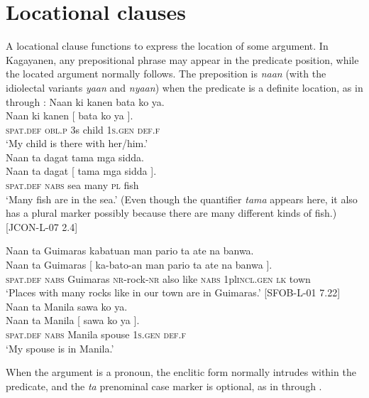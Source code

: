 \section{Locational clauses}
\label{bkm:Ref229903412}\label{sec:locationalclauses}

A locational clause functions to express the location of some argument. In Kagayanen, any prepositional phrase may appear in the predicate position, while the located argument normally follows. The preposition is \textit{naan} (with the idiolectal variants \textit{yaan} and \textit{nyaan}) when the predicate is a definite location, as in  through : 
\ea
\label{bkm:Ref107331810}
Naan  ki  kanen  bata  ko  ya. \\\smallskip
\gll Naan  ki  kanen  [ bata  ko  ya{ }]. \\
\textsc{spat.def}  \textsc{obl.p} 3s {} child  1\textsc{s.gen}  \textsc{def.f} \\
\glt ‘My child is there with her/him.’ \\
\z
\ea
Naan  ta  dagat  tama  mga  sidda. \\\smallskip
\gll Naan  ta  dagat [ tama  mga  sidda{ }]. \\
\textsc{spat.def}  \textsc{nabs}  sea {} many  \textsc{pl}  fish \\
\glt ‘Many fish are in the sea.’ (Even though the quantifier \textit{tama} appears here, it also has a plural marker possibly because there are many different kinds of fish.) [JCON-L-07 2.4]
\z

\newpage
\ea
Naan  ta  Guimaras  kabatuan  man  pario  ta  ate  na  banwa. \\\smallskip
\gll Naan  ta  Guimaras  [ ka-bato-an  man  pario  ta  ate  na  banwa{ }]. \\
\textsc{spat.def}  \textsc{nabs}  Guimaras  {} \textsc{nr}-rock-\textsc{nr}  also  like  \textsc{nabs}  1pl\textsc{incl.gen}  \textsc{lk}  town \\
\glt ‘Places with many rocks like in our town are in Guimaras.’ [SFOB-L-01 7.22]
\z
\ea
\label{bkm:Ref444841001}
Naan  ta  Manila  sawa  ko  ya. \\\smallskip
\gll Naan  ta  Manila  [ sawa  ko  ya{ }]. \\
\textsc{spat.def}  \textsc{nabs}  Manila {} spouse  1\textsc{s.gen}  \textsc{def.f} \\
\glt ‘My spouse is in Manila.’
\z

When the argument is a pronoun, the enclitic form normally intrudes within the predicate, and the \textit{ta} prenominal case marker is optional, as in  through .

